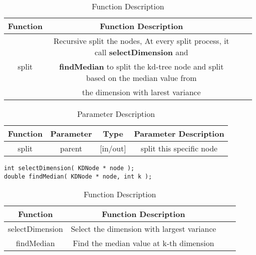 \documentclass[paper=a4, fontsize=11pt]{scrartcl} %
\numberwithin{equation}{section} %
\numberwithin{figure}{section} %
\numberwithin{table}{section} %
\begin{document}
\begin{table}[H]
    \centering
    \begin{tabular}{|c|c| lp{}}
        \hline
        \textbf{Function} & \textbf{Function Description} \\\hline
   \multirow{3}{*}{split} & Recursive split the nodes, At every split process, it call \textbf{selectDimension} and \\& \textbf{findMedian} to split the kd-tree node and split based on the median value from \\& the dimension with larest variance\\\hline
    \end{tabular}
    \caption{Function Description}\label{nolock}
\end{table}

\begin{table}[h]
    \centering
    \begin{tabular}{|c|c|c|c|}
        \hline
        \textbf{Function} & \textbf{Parameter} & \textbf{Type} & \textbf{Parameter Description} \\\hline
            split & parent & [in/out] & split this specific node \\\hline
    \end{tabular}
    \caption{Parameter Description}\label{nolock}
\end{table}

\begin{lstlisting}
int selectDimension( KDNode * node );
double findMedian( KDNode * node, int k );
\end{lstlisting}

\begin{table}[H]
    \centering
    \begin{tabular}{|c|c| lp{}}
        \hline
        \textbf{Function} & \textbf{Function Description} \\\hline
                    selectDimension & Select the dimension with largest variance\\\hline
                    findMedian & Find the median value at k-th dimension\\\hline
    \end{tabular}
    \caption{Function Description}\label{nolock}
\end{table}
\end{document}
